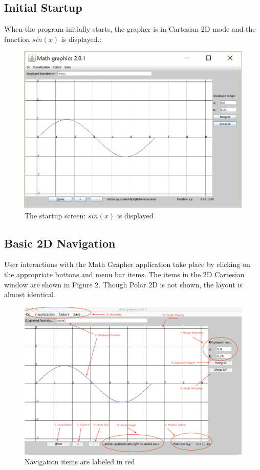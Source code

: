 \documentclass{article}[12 pt]
\begin{document}
		\subsection{Initial Startup}
		When the program initially starts, the grapher is in Cartesian 2D mode and the function $sin(x)$ is displayed.:
			\begin{figure}[h!]
 				\centering
 				\includegraphics[scale = .90]{startupScreen}
 				\caption{The startup screen: $sin(x)$ is displayed}
 			\end{figure}
			
		\subsection{Basic 2D Navigation}
		User interactions with the Math Grapher application take place by clicking on the appropriate buttons and menu bar items. The items in the 2D Cartesian window are shown in Figure 2.  Though Polar 2D is not shown, the layout is almost identical. 
			\begin{figure}[h!] 
				\centering
				\includegraphics[scale = .40]{Map}
				\caption{Navigation items are labeled in red}
			\end{figure}
 		
\end{document}
